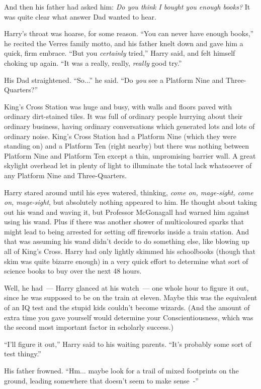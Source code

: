 And then his father had asked him: \emph{Do you think I bought you enough books?} It was quite clear what answer Dad wanted to hear.

Harry's throat was hoarse, for some reason. ``You can never have enough books,'' he recited the Verres family motto, and his father knelt down and gave him a quick, firm embrace. ``But you \emph{certainly} tried,'' Harry said, and felt himself choking up again. ``It was a really, really, \emph{really} good try.''

His Dad straightened. ``So...'' he said. ``Do \emph{you} see a Platform Nine and Three-Quarters?''

King's Cross Station was huge and busy, with walls and floors paved with ordinary dirt-stained tiles. It was full of ordinary people hurrying about their ordinary business, having ordinary conversations which generated lots and lots of ordinary noise. King's Cross Station had a Platform Nine (which they were standing on) and a Platform Ten (right nearby) but there was nothing between Platform Nine and Platform Ten except a thin, unpromising barrier wall. A great skylight overhead let in plenty of light to illuminate the total lack whatsoever of any Platform Nine and Three-Quarters.

Harry stared around until his eyes watered, thinking, \emph{come on, mage-sight, come on, mage-sight}, but absolutely nothing appeared to him. He thought about taking out his wand and waving it, but Professor McGonagall had warned him against using his wand. Plus if there was another shower of multicoloured sparks that might lead to being arrested for setting off fireworks inside a train station. And that was assuming his wand didn't decide to do something else, like blowing up all of King's Cross. Harry had only lightly skimmed his schoolbooks (though that skim was quite bizarre enough) in a very quick effort to determine what sort of science books to buy over the next 48 hours.

Well, he had~--- Harry glanced at his watch~--- one whole hour to figure it out, since he was supposed to be on the train at eleven. Maybe this was the equivalent of an IQ test and the stupid kids couldn't become wizards. (And the amount of extra time you gave yourself would determine your Conscientiousness, which was the second most important factor in scholarly success.)

``I'll figure it out,'' Harry said to his waiting parents. ``It's probably some sort of test thingy.''

His father frowned. ``Hm... maybe look for a trail of mixed footprints on the ground, leading somewhere that doesn't seem to make sense~-''


